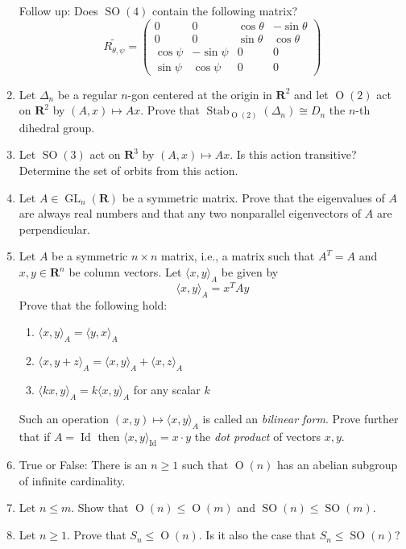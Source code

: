 \documentclass[12pt]{article}
\numberwithin{equation}{subsection}
\theoremstyle{note}
\newcommand{\GL}{\operatorname{GL}}
\newcommand{\Or}{\operatorname{O}}
\newcommand{\SO}{\operatorname{SO}}
\newcommand{\Id}{\operatorname{Id}}
\newcommand{\Stab}{\operatorname{Stab}}
\begin{document}
\begin{enumerate}[label=\arabic*.]
Follow up: Does $\SO(4)$ contain the following matrix?  \[\widetilde{R_{\theta,\psi}} = \begin{pmatrix} 0 & 0 & \cos \theta & - \sin\theta  \\
0 & 0 &\sin\theta & \cos\theta  \\
\cos\psi & -\sin\psi & 0 & 0\\
 \sin\psi & \cos\psi & 0 & 0 \end{pmatrix}\]
	
	\item Let $\Delta_n$ be a regular $n$-gon centered at the origin in $\mathbf{R}^2$ and let $\Or(2)$ act on $\mathbf{R}^2$ by $(A,x)\mapsto Ax$. Prove that $\Stab_{\Or(2)}(\Delta_n)\cong D_n$ the $n$-th dihedral group.
	
	\item Let $\SO(3)$ act on $\mathbf{R}^3$ by $(A,x)\mapsto Ax$. Is this action transitive? Determine the set of orbits from this action. 

	\item Let $A\in \GL_n(\mathbf{R})$ be a symmetric matrix. Prove that the eigenvalues of $A$ are always real numbers and that any two nonparallel eigenvectors of $A$ are perpendicular. 
	
	\item \label{bilinear-form}Let $A$ be a symmetric $n\times n$ matrix, i.e., a matrix such that $A^T=A$ and $x,y\in \mathbf{R}^n$ be column vectors. Let $\langle x,y\rangle_A$ be given by \[\langle x,y\rangle_A=x^T A y\]
	Prove that the following hold: \begin{enumerate}
		\item $\langle x, y\rangle_A=\langle y,x\rangle_A$
		\item $\langle x, y+z\rangle_A=\langle x, y\rangle_A+\langle x, z\rangle_A$
		\item $\langle kx, y\rangle_A=k\langle x, y\rangle_A$ \quad for any scalar $k$
	\end{enumerate}
	Such an operation $(x,y)\mapsto \langle x,y\rangle_A$ is called an \textit{bilinear form}. Prove further that if $A=\Id$ then $\langle x,y\rangle_{\Id}=x\cdot y$ the \textit{dot product} of vectors $x,y$.

	

	\item True or False: There is an $n\geq 1$ such that  $\Or(n)$ has an abelian subgroup of infinite cardinality. 
	\item Let $n\leq m$. Show that $\Or(n)\leq \Or(m)$ and $\SO(n)\leq \SO(m)$.
	\item Let $n\geq 1$. Prove that $S_n\leq \Or(n)$. Is it also the case that $S_n\leq \SO(n)$?
	

\end{enumerate}
\end{document}

